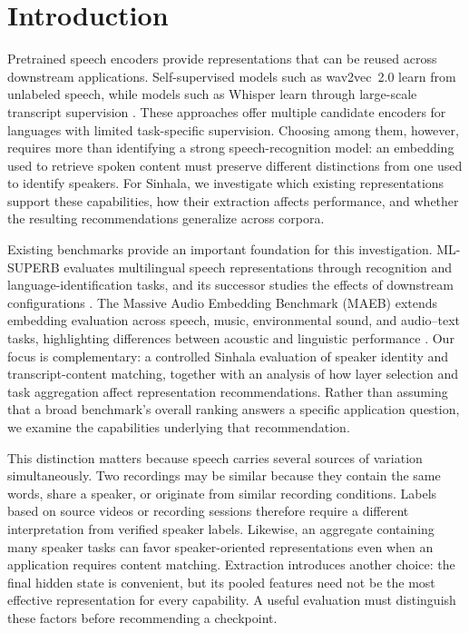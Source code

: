 \section{Introduction}
\label{sec:introduction}

Pretrained speech encoders provide representations that can be reused across downstream applications. Self-supervised models such as wav2vec~2.0 learn from unlabeled speech, while models such as Whisper learn through large-scale transcript supervision \citep{baevski2020wav2vec,radford2023whisper}. These approaches offer multiple candidate encoders for languages with limited task-specific supervision. Choosing among them, however, requires more than identifying a strong speech-recognition model: an embedding used to retrieve spoken content must preserve different distinctions from one used to identify speakers. For Sinhala, we investigate which existing representations support these capabilities, how their extraction affects performance, and whether the resulting recommendations generalize across corpora.

Existing benchmarks provide an important foundation for this investigation. ML-SUPERB evaluates multilingual speech representations through recognition and language-identification tasks, and its successor studies the effects of downstream configurations \citep{shi2023mlsuperb,shi2024mlsuperb2}. The Massive Audio Embedding Benchmark (MAEB) extends embedding evaluation across speech, music, environmental sound, and audio--text tasks, highlighting differences between acoustic and linguistic performance \citep{elassadi2026maeb}. Our focus is complementary: a controlled Sinhala evaluation of speaker identity and transcript-content matching, together with an analysis of how layer selection and task aggregation affect representation recommendations. Rather than assuming that a broad benchmark's overall ranking answers a specific application question, we examine the capabilities underlying that recommendation.

This distinction matters because speech carries several sources of variation simultaneously. Two recordings may be similar because they contain the same words, share a speaker, or originate from similar recording conditions. Labels based on source videos or recording sessions therefore require a different interpretation from verified speaker labels. Likewise, an aggregate containing many speaker tasks can favor speaker-oriented representations even when an application requires content matching. Extraction introduces another choice: the final hidden state is convenient, but its pooled features need not be the most effective representation for every capability. A useful evaluation must distinguish these factors before recommending a checkpoint.

